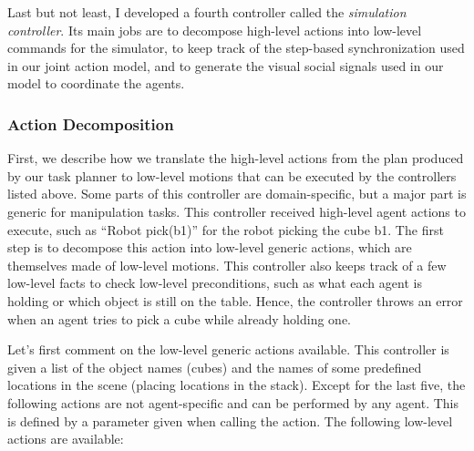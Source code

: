 Last but not least, I developed a fourth controller called the \textit{simulation controller}. Its main jobs are to decompose high-level actions into low-level commands for the simulator, to keep track of the step-based synchronization used in our joint action model, and to generate the visual social signals used in our model to coordinate the agents. 

\subsubsection{Action Decomposition}

First, we describe how we translate the high-level actions from the plan produced by our task planner to low-level motions that can be executed by the controllers listed above. Some parts of this controller are domain-specific, but a major part is generic for manipulation tasks. This controller received high-level agent actions to execute, such as ``Robot pick(b1)'' for the robot picking the cube b1. The first step is to decompose this action into low-level generic actions, which are themselves made of low-level motions. This controller also keeps track of a few low-level facts to check low-level preconditions, such as what each agent is holding or which object is still on the table. Hence, the controller throws an error when an agent tries to pick a cube while already holding one.

Let's first comment on the low-level generic actions available. This controller is given a list of the object names (cubes) and the names of some predefined locations in the scene (placing locations in the stack). Except for the last five, the following actions are not agent-specific and can be performed by any agent. This is defined by a parameter given when calling the action. The following low-level actions are available:

